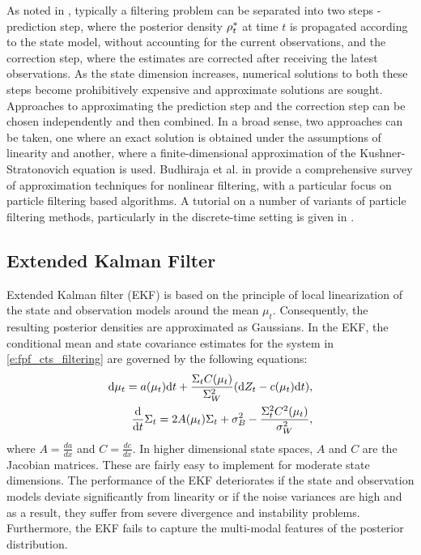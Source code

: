 As noted in , typically a filtering problem can be separated into two steps - prediction step, where the posterior density $\rho^*_t$ at time $t$ is propagated according to the state model, without accounting for the current observations, and the correction step, where the estimates are corrected after receiving the latest observations. As the state dimension increases, numerical solutions to both these steps become prohibitively expensive and approximate solutions are sought. Approaches to approximating the prediction step and the correction step can be chosen independently and then combined. In a broad sense, two approaches can be taken, one where an exact solution is obtained under the assumptions of linearity and another, where a finite-dimensional approximation of the Kushner-Stratonovich equation is used. Budhiraja et al. in \cite{budchelee07} provide a comprehensive survey of approximation techniques for nonlinear filtering, with a particular focus on particle filtering based algorithms. A tutorial on a number of variants of particle filtering methods, particularly in the discrete-time setting is given in \cite{arumasgorcla02}.
\subsection{Extended Kalman Filter}
\label{s:ekf}
Extended Kalman filter (EKF) \cite{jaz70} is based on the principle of local linearization of the state and observation models around the mean $\mu_t$. Consequently, the resulting posterior densities are approximated as Gaussians. In the EKF, the conditional mean and state covariance estimates for the system in \eqref{e:fpf_cts_filtering} are governed by the following equations: 
\begin{align}
\ud \mu_t = a(\mu_t) \ud t + \frac{\Sigma_t C(\mu_t)}{\Sigma^2_W} (\ud Z_t - c(\mu_t) \ud t), \\
\frac{\ud}{\ud t} \Sigma_t = 2 A(\mu_t) \Sigma_t  + \sigma^2_B - \frac{\Sigma^2_t C^2(\mu_t)}{\sigma^2_W}, 
\label{e:fpf_ekf}
\end{align}
where $A = \frac{d a}{dx}$ and $C = \frac{d c}{dx}$. In higher dimensional state spaces, $A$ and $C$ are the Jacobian matrices. These are fairly easy to implement for moderate state dimensions. The performance of the EKF deteriorates if the state and observation models deviate significantly from linearity or if the noise variances are high and as a result, they suffer from severe divergence and instability problems. Furthermore, the EKF fails to capture the multi-modal features of the posterior distribution.

